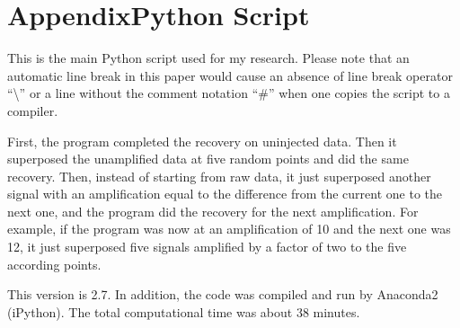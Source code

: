 \documentclass[aps,prd,preprint]{revtex4}
\begin{document}


\section{Appendix\textemdash Python Script \label{sec:Appendix}}
This is the main Python script used for my research. Please note that an automatic line break in this paper would cause an absence of line break operator \enquote{\textbackslash} or a line without the comment notation \enquote{\#} when one copies the script to a compiler.
\par First, the program completed the recovery on uninjected data. Then it superposed the unamplified data at five random points and did the same recovery. Then, instead of starting from raw data, it just superposed another signal with an amplification equal to the difference from the current one to the next one, and the program did the recovery for the next amplification. For example, if the program was now at an amplification of 10 and the next one was 12, it just superposed five signals amplified by a factor of two to the five according points.
\par This version is 2.7. In addition, the code was compiled and run by Anaconda2 (iPython). The total computational time was about 38 minutes.
\end{document}
